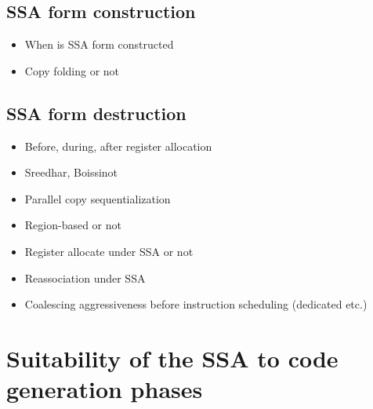 
\subsection{SSA form construction}

\begin{itemize}

\item When is SSA form constructed

\item Copy folding or not

\end{itemize}

\subsection{SSA form destruction}

\begin{itemize}

\item Before, during, after register allocation

\item Sreedhar, Boissinot

\item Parallel copy sequentialization

\end{itemize}

\begin{itemize}

\item Region-based or not

\item Register allocate under SSA or not

\item Reassociation under SSA

\item Coalescing aggressiveness before instruction scheduling (dedicated etc.)

\end{itemize}


\section{Suitability of the SSA to code generation phases}
\label{sec:ssa-codegen-suitability}

